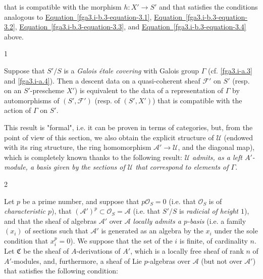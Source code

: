  that is compatible with the morphism \(h\colon  X'\to  S'\) and that satisfies the conditions analogous to \hyperref[fga3.i-b.3-equation-3.1]{Equation~\ref*{fga3.i-b.3-equation-3.1}}, \hyperref[fga3.i-b.3-equation-3.2]{Equation~\ref*{fga3.i-b.3-equation-3.2}}, \hyperref[fga3.i-b.3-equation-3.3]{Equation~\ref*{fga3.i-b.3-equation-3.3}}, and \hyperref[fga3.i-b.3-equation-3.4]{Equation~\ref*{fga3.i-b.3-equation-3.4}} above.\begin{example}{1}\label{fga3.i-b.3-example-1}\skipsinglepar\par{}Suppose that \(S'/S\) is a \emph{Galois étale covering} with Galois group \(\Gamma \) (cf. \cref{fga3.i-a.3} and \cref{fga3.i-a.4}).
    Then a descent data on a quasi-coherent sheaf \(\mathcal {F}'\) on \(S'\) (resp. on an \(S'\)-prescheme \(X'\)) is equivalent to the data of a representation of \(\Gamma \) by automorphisms of \((S',\mathcal {F}')\) (resp. of \((S',X')\)) that is compatible with the action of \(\Gamma \) on \(S'\).
    
    This result is "formal", i.e. it can be proven in terms of categories, but, from the point of view of this section, we also obtain the explicit structure of \(\mathscr {U}\) (endowed with its ring structure, the ring homomorphism \(\mathscr {A}'\to \mathscr {U}\), and the diagonal map), which is completely known thanks to the following result:
    \emph{\(\mathscr {U}\) admits, as a left \(A'\)-module, a basis given by the sections of \(\mathscr {U}\) that correspond to elements of \(\Gamma \)}.\end{example}\begin{example}{2}\label{fga3.i-b.3-example-2}\skipsinglepar\par{}Let \(p\) be a prime number, and suppose that \(p\mathscr {O}_S=0\) (i.e. that \(\mathscr {O}_S\) is of \emph{characteristic \(p\)}), that \((\mathscr {A}')^p\subset \mathscr {O}_S=\mathscr {A}\) (i.e. that \(S'/S\) is \emph{radicial of height \(1\)}), and that the sheaf of algebras \(\mathscr {A}'\) over \(\mathscr {A}\) \emph{locally admits a \(p\)-basis} (i.e. a family \((x_i)\) of sections such that \(\mathscr {A}'\) is generated as an algebra by the \(x_i\) under the sole condition that \(x_i^p=0\)).
    We suppose that the set of the \(i\) is finite, of cardinality \(n\).
    Let \(\mathfrak {C}\) be the sheaf of \(A\)-derivations of \(A'\), which is a locally free sheaf of rank \(n\) of \(A'\)-modules, and, furthermore, a sheaf of Lie \(p\)-algebras over \(\mathscr {A}\) (but not over \(\mathscr {A}'\)) that satisfies the following condition:


\end{example}
